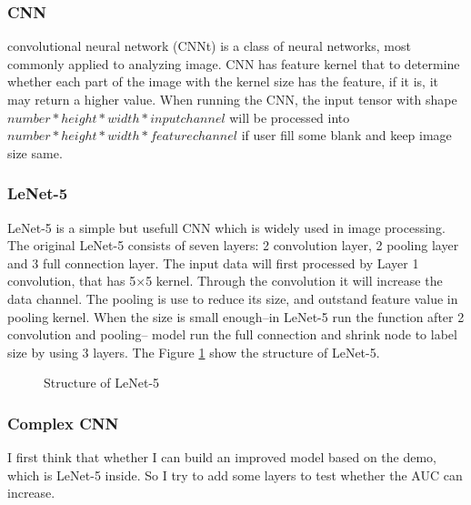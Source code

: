 \documentclass{article}
\begin{document}
\subsubsection{CNN}
convolutional neural network (CNNt) is a class of neural networks, most commonly applied to analyzing image. CNN has feature kernel that to determine whether each part of the image with the kernel size has the feature, if it is, it may return a higher value. When running the CNN, the input tensor with shape $number*height*width*input channel$ will be processed into $number*height*width*feature channel$ if user fill some blank and keep image size same.

\subsubsection{LeNet-5}
LeNet-5 is a simple but usefull CNN which is widely used in image processing. The original LeNet-5 consists of seven layers: 2 convolution layer, 2 pooling layer and 3 full connection layer. The input data will first processed by Layer 1 convolution, that has 5$\times$5 kernel. Through the convolution it will increase the data channel. The pooling is use to reduce its size, and outstand feature value in pooling kernel. When the size is small enough--in LeNet-5 run the function after 2 convolution and pooling-- model run the full connection and shrink node to label size by using 3 layers. The Figure \ref{LeNet} show the structure of LeNet-5.
\begin{figure}[h]
  \centering
  \caption{Structure of LeNet-5}
  \label{LeNet}
\end{figure} 

\subsubsection{Complex CNN}
I first think that whether I can build an improved model based on the demo, which is LeNet-5 inside. So I try to add some layers to test whether the AUC can increase.
\end{document}
